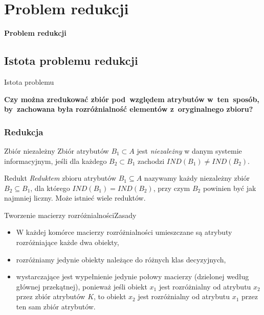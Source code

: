 \documentclass[10pt]{beamer}
\begin{document}
\section{Problem redukcji}


\begin{frame}
\begin{Huge}
\textbf{Problem redukcji}
\end{Huge}
\end{frame}

\subsection{Istota problemu redukcji}
\begin{frame}{Istota problemu}
\begin{spacing}{1.5}
\textbf{Czy można zredukować zbiór pod~względem atrybutów w~ten~sposób, by~zachowana była rozróżnialność elementów z~oryginalnego zbioru?}
\end{spacing}
\end{frame}

\begin{frame}
\frametitle{Redukcja}
\begin{spacing}{1.5}
\begin{block}{Zbiór niezależny}
Zbiór atrybutów $B_{1} \subset A$ jest \textit{niezależny} w danym systemie informacyjnym, jeśli dla każdego $B_{2} \subset B_{1}$ zachodzi $IND(B_{1}) \neq IND(B_{2})$.
\end{block}

\begin{block}{Redukt}
\textit{Reduktem} zbioru atrybutów $B_{1} \subseteq A$ nazywamy każdy niezależny zbiór $B_{2} \subseteq B_{1}$, dla którego $IND(B_{1}) = IND(B_{2})$, przy czym $B_{2}$ powinien być 
jak najmniej liczny. Może istnieć wiele reduktów.
\end{block}
\end{spacing}
\end{frame}


\begin{frame}{Tworzenie macierzy rozróżnialności}{Zasady}
\begin{spacing}{1.5}
\begin{itemize}
\item W każdej komórce macierzy rozróżnialności umieszczane są atrybuty rozróżniające każde dwa obiekty,
\item rozróżniamy jedynie obiekty należące do różnych klas decyzyjnych,
\item wystarczające jest wypełnienie jedynie połowy macierzy (dzielonej według głównej przekątnej), ponieważ jeśli obiekt $x_{1}$ jest rozróżnialny od atrybutu $x_{2}$ przez zbiór atrybutów $K$, to obiekt $x_{2}$ jest rozróżnialny od atrybutu $x_{1}$ przez ten sam zbiór atrybutów.
\end{itemize}
\end{spacing}
\end{frame}
\end{document}
